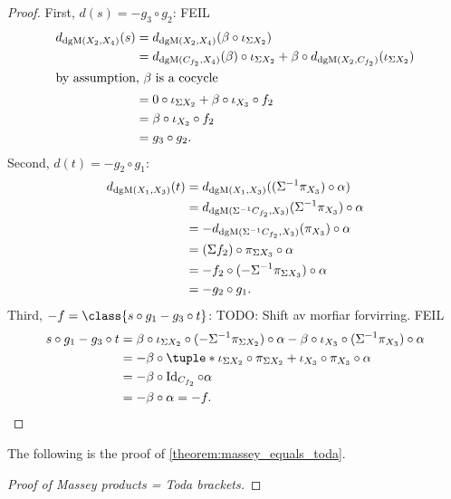 \begin{proof}
    First, \( d(s) = -g_3 \circ g_2 \): FEIL
    \begin{align*}
        d_{\operatorname{dgM}(X_2, X_4)}(s) &= d_{\operatorname{dgM}(X_2, X_4)}(\beta \circ \iota_{\Sigma X_2}) \\
        &= d_{\operatorname{dgM}(C_{f_2}, X_4)}(\beta) \circ \iota_{\Sigma X_2} + \beta \circ d_{\operatorname{dgM}(X_2, C_{f_2})}(\iota_{\Sigma X_2}) \\
        \intertext{by assumption, \( \beta \) is a cocycle}
        &= 0 \circ \iota_{\Sigma X_2} + \beta \circ \iota_{X_3} \circ f_2 \\
        &= \beta \circ \iota_{X_3} \circ f_2 \\
        &= g_3 \circ g_2.
    \end{align*}
    Second, \( d(t) = - g_2 \circ g_1 \):
    \begin{align*}
         d_{\operatorname{dgM}(X_1, X_3)}(t) &= d_{\operatorname{dgM}(X_1, X_3)}((\Sigma^{-1} \pi_{X_3}) \circ \alpha) \\
         &= d_{\operatorname{dgM}(\Sigma^{-1} C_{f_2}, X_3)}(\Sigma^{-1} \pi_{X_3}) \circ \alpha \\
         &= - d_{\operatorname{dgM}(\Sigma^{-1} C_{f_2}, X_3)}(\pi_{X_3}) \circ \alpha \\
         &= (\Sigma f_2) \circ \pi_{\Sigma X_3} \circ \alpha \\
         &= - f_2 \circ (- \Sigma^{-1} \pi_{\Sigma X_3}) \circ \alpha \\
         &= - g_2 \circ g_1.
    \end{align*}
    Third, \( -f = \class{s \circ g_1 - g_3 \circ t} \): TODO: Shift av morfiar forvirring. FEIL
    \begin{align*}
        s \circ g_1 - g_3 \circ t &= \beta \circ \iota_{\Sigma X_2} \circ (-\Sigma^{-1} \pi_{\Sigma X_2}) \circ \alpha - \beta \circ \iota_{X_3} \circ (\Sigma^{-1} \pi_{X_3}) \circ \alpha \\
        &= - \beta \circ \tuple*{\iota_{\Sigma X_2} \circ \pi_{\Sigma X_2} + \iota_{X_3} \circ \pi_{X_3}} \circ \alpha \\
        &= - \beta \circ \Id_{C_{f_2}} \circ \alpha \\
        &= - \beta \circ \alpha = - f.
    \end{align*}
\end{proof}

The following is the proof of \autoref{theorem:massey_equals_toda}.

\begin{proof}[Proof of Massey products = Toda brackets]
    
\end{proof}